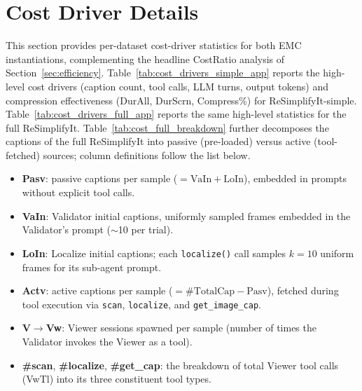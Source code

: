 \section{Cost Driver Details}
\label{appendix:efficiency_full}

This section provides per-dataset cost-driver statistics for both EMC instantiations, complementing the headline CostRatio analysis of Section~\ref{sec:efficiency}. Table~\ref{tab:cost_drivers_simple_app} reports the high-level cost drivers (caption count, tool calls, LLM turns, output tokens) and compression effectiveness (DurAll, DurScrn, Compress\%) for ReSimplifyIt-simple. Table~\ref{tab:cost_drivers_full_app} reports the same high-level statistics for the full ReSimplifyIt. Table~\ref{tab:cost_full_breakdown} further decomposes the captions of the full ReSimplifyIt into passive (pre-loaded) versus active (tool-fetched) sources; column definitions follow the list below.

\begin{itemize}[leftmargin=*,noitemsep,topsep=0pt]
    \item \textbf{Pasv}: passive captions per sample ($=\text{VaIn}+\text{LoIn}$), embedded in prompts without explicit tool calls.
    \item \textbf{VaIn}: Validator initial captions, uniformly sampled frames embedded in the Validator's prompt ($\sim$10 per trial).
    \item \textbf{LoIn}: Localize initial captions; each \texttt{localize()} call samples $k{=}10$ uniform frames for its sub-agent prompt.
    \item \textbf{Actv}: active captions per sample ($=\text{\#TotalCap}-\text{Pasv}$), fetched during tool execution via \texttt{scan}, \texttt{localize}, and \texttt{get\_image\_cap}.
    \item \textbf{V$\rightarrow$Vw}: Viewer sessions spawned per sample (number of times the Validator invokes the Viewer as a tool).
    \item \textbf{\#scan}, \textbf{\#localize}, \textbf{\#get\_cap}: the breakdown of total Viewer tool calls (VwTl) into its three constituent tool types.
\end{itemize}

